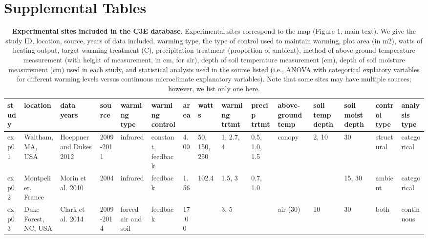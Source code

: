 \documentclass{article}
\begin{document}
\section* {Supplemental Tables} 
\begin{landscape}
\begin{footnotesize} 
\begin{table}[ht]
\centering
\caption{\textbf{Experimental sites included in the C3E database}. Experimental sites correspond to the map (Figure 1, main text). We give the study ID, location, source, years of data included, warming type, the type of control used to maintain warming, plot area (in m2), watts of heating output, target warming treatment (\degree C), precipitation treatment (proportion of ambient), method of above-ground temperature measurement (with height of measurement, in cm, for air), depth of soil temperature measurement (cm), depth of soil moisture measurement (cm) used in each study, and statistical analysis used in the source listed (i.e., ANOVA with categorical explatory variables for different warming levels versus continuous microclimate explanatory variables). Note that some sites may have multiple sources; however, we list only one here.} 
\label{tab:methods}
\begingroup\footnotesize
\begin{tabular}{|p{}|p{}|p{}|p{}|p{}|p{}|p{}|p{}|p{}|p{}|p{}|p{}|p{}|p{}|p{}|}
  \hline
study & location & data years & source & warming type & warming control & area & watts & warming trtmt & precip trtmt & above-ground temp & soil temp depth & soil moist depth & control type & analysis type \\ 
  \hline
exp01 & Waltham, MA, USA & Hoeppner and Dukes 2012 & 2009-2011 & infrared & constant, feedback & 4.00 & 50, 150, 250 & 1, 2.7, 4 & 0.5, 1.0, 1.5 & canopy & 2, 10 & 30 & structural & categorical \\ 
   \hline
exp02 & Montpelier, France & Morin et al. 2010 & 2004 & infrared & feedback & 1.56 & 102.4 & 1.5, 3 & 0.7, 1.0 &   &   & 15, 30 & ambient & categorical \\ 
   \hline
exp03 & Duke Forest, NC, USA & Clark et al. 2014 & 2009-2014 & forced air and soil & feedback & 17.00 &  & 3, 5 &   & air (30) & 10 & 30 & both & continuous \\ 

\end{tabular}
\end{table}
\end{footnotesize}
\end{landscape}
\end{document}
